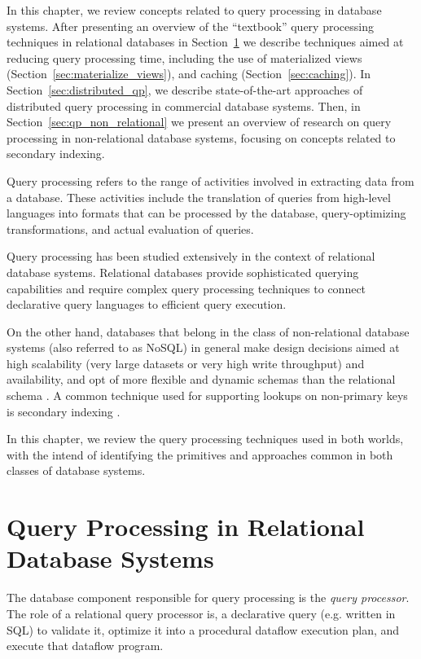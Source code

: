 In this chapter, we review concepts related to query processing in database systems.
After presenting an overview of the ``textbook'' query processing techniques in relational databases in Section~\ref{sec:query_pr_relational}
we describe techniques aimed at reducing query processing time, including the use of materialized views (Section~\ref{sec:materialize_views}),
and caching (Section~\ref{sec:caching}).
In Section~\ref{sec:distributed_qp}, we describe state-of-the-art approaches of distributed query processing in commercial database systems.
Then, in Section~\ref{sec:qp_non_relational} we present an overview of research on query processing in non-relational database systems,
focusing on concepts related to secondary indexing.

\bigskip
\noindent
Query processing refers to the range of activities involved in extracting data from a database.
These activities include the translation of queries from high-level languages into formats that can be processed
by the database, query-optimizing transformations, and actual evaluation of queries.

Query processing has been studied extensively in the context of relational database systems.
Relational databases provide sophisticated querying capabilities and require complex query processing techniques
to connect declarative query languages to efficient query execution.

On the other hand, databases that belong in the class of non-relational database systems (also referred to as NoSQL)
in general make design decisions aimed at high scalability (very large datasets or very high write throughput) and availability,
and opt of more flexible and dynamic schemas than the relational schema \cite{couchbase:nosqladoption}.
A common technique used for supporting lookups on non-primary keys is secondary indexing \cite{riakv:secondaryindexes, cassandra:secondaryindexing}.

In this chapter, we review the query processing techniques used in both worlds,
with the intend of identifying the primitives and approaches common in both classes of database systems.

\section{Query Processing in Relational Database Systems}
\label{sec:query_pr_relational}
The database component responsible for query processing is the \textit{query processor}.
The role of a relational query processor is, a declarative query (e.g. written in SQL) to validate it,
optimize it into a procedural dataflow execution plan, and execute that dataflow program.

